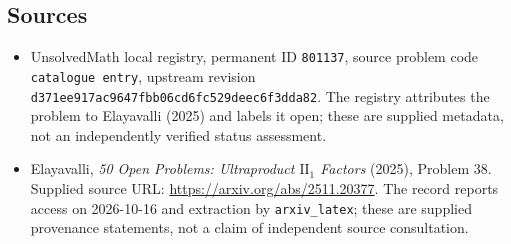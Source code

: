 \documentclass[11pt]{article}
\begin{document}
\subsection{Sources}
\begin{itemize}
\item UnsolvedMath local registry, permanent ID \texttt{801137}, source problem code \texttt{catalogue entry}, upstream revision \texttt{d371ee917ac9647fbb06cd6fc529deec6f3dda82}. The registry attributes the problem to Elayavalli (2025) and labels it open; these are supplied metadata, not an independently verified status assessment.
\item Elayavalli, \emph{50 Open Problems: Ultraproduct \(\mathrm{II}_1\) Factors} (2025), Problem 38. Supplied source URL: \url{https://arxiv.org/abs/2511.20377}. The record reports access on 2026-10-16 and extraction by \texttt{arxiv\_latex}; these are supplied provenance statements, not a claim of independent source consultation.
\end{itemize}
\end{document}
